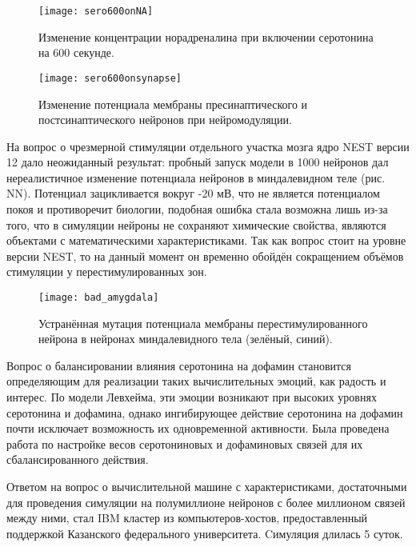 \begin{figure}
	\centering
	\texttt{[image: sero600onNA]}
	\caption{Изменение концентрации норадреналина при включении серотонина на 600 секунде.}
	\label{fig:sero600onNA}
\end{figure}

\begin{figure}
	\centering
	\texttt{[image: sero600onsynapse]}
	\caption{Изменение потенциала мембраны пресинаптического и постсинаптического нейронов при нейромодуляции.}
	\label{fig:sero600onsynapse}
\end{figure}

На вопрос о чрезмерной стимуляции отдельного участка мозга ядро NEST версии 12 дало неожиданный результат: пробный запуск модели в 1000 нейронов дал нереалистичное изменение потенциала нейронов в миндалевидном теле (рис. NN). Потенциал зацикливается вокруг -20 мВ, что не является потенциалом покоя и противоречит биологии, подобная ошибка стала возможна лишь из-за того, что в симуляции нейроны не сохраняют химические свойства, являются объектами с математическими характеристиками. Так как вопрос стоит на уровне версии NEST, то на данный момент он временно обойдён сокращением объёмов стимуляции у перестимулированных зон.


\begin{figure}
	\centering
	\texttt{[image: bad\_amygdala]}
	\caption{Устранённая мутация потенциала мембраны перестимулированного нейрона в нейронах миндалевидного тела (зелёный, синий).}
	\label{fig:bad_amygdala}
\end{figure}

Вопрос о балансировании влияния серотонина на дофамин становится определяющим для реализации таких вычислительных эмоций, как радость и интерес. По модели Левхейма, эти эмоции возникают при высоких уровнях серотонина и дофамина, однако ингибирующее действие серотонина на дофамин почти исключает возможность их одновременной активности. Была проведена работа по настройке весов серотониновых и дофаминовых связей для их сбалансированного действия.


Ответом на вопрос о вычислительной машине с характеристиками, достаточными для проведения симуляции на полумиллионе нейронов с более миллионом связей между ними, стал IBM кластер из компьютеров-хостов, предоставленный поддержкой Казанского федерального университета. Cимуляция длилась 5 суток.